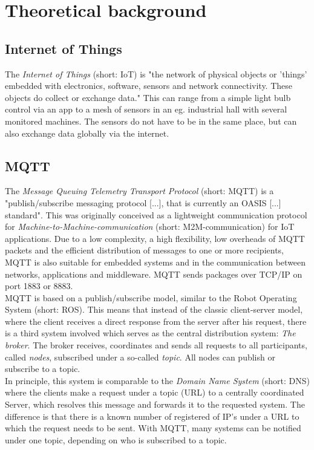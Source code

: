 \section{Theoretical background}\label{theory}

\subsection{Internet of Things}\label{iot}

The \textit{Internet of Things} (short: IoT) is "the network of physical objects or 'things' embedded with electronics, software, sensors and network connectivity. These objects do collect or exchange data." \cite{iot} This can range from a simple light bulb control via an app to a mesh of sensors in an eg. industrial hall with several monitored machines. The sensors do not have to be in the same place, but can also exchange data globally via the internet.


\subsection{MQTT}\label{mqtt}

The \textit{Message Queuing Telemetry Transport Protocol} (short: MQTT) is a "publish/subscribe messaging protocol [...], that is currently an OASIS [...] standard". \cite{mqtt} This was originally conceived as a lightweight communication protocol for \textit{Machine-to-Machine-communication} (short: M2M-communication) for IoT applications. Due to a low complexity, a high flexibility, low overheads of MQTT packets and the efficient distribution of messages to one or more recipients, MQTT is also suitable for embedded systems and in the communication between networks, applications and middleware. MQTT sends packages over TCP/IP on port 1883 or 8883. \cite{iot} \cite{oasis}\\

MQTT is based on a publish/subscribe model, similar to the Robot Operating System (short: ROS). This means that instead of the classic client-server model, where the client receives a direct response from the server after his request, there is a third system involved which serves as the central distribution system: \textit{The broker}. The broker receives, coordinates and sends all requests to all participants, called \textit{nodes}, subscribed under a so-called \textit{topic}. All nodes can publish or subscribe to a topic. \cite{iot}\\

In principle, this system is comparable to the \textit{Domain Name System} (short: DNS) where the clients make a request under a topic (URL) to a centrally coordinated Server, which resolves this message and forwards it to the requested system. The difference is that there is a known number of registered of IP’s under a URL to which the request needs to be sent. With MQTT, many systems can be notified under one topic, depending on who is subscribed to a topic.\\


